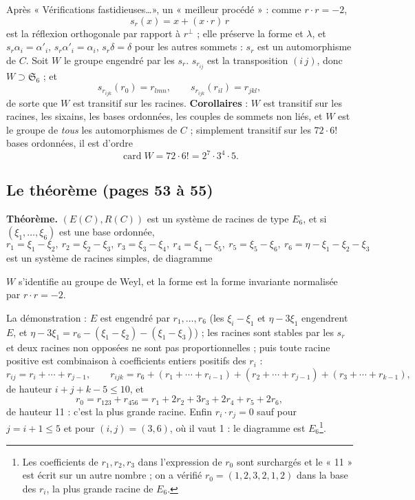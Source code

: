 \documentclass[11pt,a4paper]{article}
\begin{document}
Après « Vérifications fastidieuses\ldots », un « meilleur procédé » : comme $r
\cdot r = -2$,
\[
s_r(x) = x + (x \cdot r)\, r
\]
est la réflexion orthogonale par rapport à $r^\perp$ ; elle préserve la forme
et $\lambda$, et $s_r \alpha_i = \alpha'_i$, $s_r \alpha'_i = \alpha_i$, $s_r
\delta = \delta$ pour les autres sommets : $s_r$ est un automorphisme de $C$.
Soit $W$ le groupe engendré par les $s_r$. $s_{r_{ij}}$ est la transposition
$(i\, j)$, donc $W \supset \mathfrak{S}_6$ ; et
\[
s_{r_{ijk}}(r_0) = r_{lmn}, \qquad s_{r_{ijk}}(r_{il}) = r_{jkl},
\]
de sorte que $W$ est transitif sur les racines. \textbf{Corollaires} : $W$ est
transitif sur les racines, les sixains, les bases ordonnées, les couples de
sommets non liés, et $W$ est le groupe de \emph{tous} les automorphismes de
$C$ ; simplement transitif sur les $72 \cdot 6!$ bases ordonnées, il est
d'ordre
\[
\operatorname{card} W = 72 \cdot 6! = 2^7 \cdot 3^4 \cdot 5 .
\]

\subsection*{Le théorème (pages 53 à 55)}

\textbf{Théorème.} $(E(C), R(C))$ est un système de racines de type $E_6$, et
si $(\xi_1, \ldots, \xi_6)$ est une base ordonnée,
\[
r_1 = \xi_1 - \xi_2, \ r_2 = \xi_2 - \xi_3, \ r_3 = \xi_3 - \xi_4, \ r_4 =
\xi_4 - \xi_5, \ r_5 = \xi_5 - \xi_6, \ r_6 = \eta - \xi_1 - \xi_2 - \xi_3
\]
est un système de racines simples, de diagramme


$W$ s'identifie au groupe de Weyl, et la forme est la forme invariante
normalisée par $r \cdot r = -2$.

La démonstration : $E$ est engendré par $r_1, \ldots, r_6$ (les $\xi_i - \xi_1$
et $\eta - 3\xi_1$ engendrent $E$, et $\eta - 3\xi_1 = r_6 - (\xi_1 - \xi_2) -
(\xi_1 - \xi_3)$) ; les racines sont stables par les $s_r$ et deux racines non
opposées ne sont pas proportionnelles ; puis toute racine positive est
combinaison à coefficients entiers positifs des $r_i$ :
\[
r_{ij} = r_i + \cdots + r_{j-1}, \qquad r_{ijk} = r_6 + (r_1 + \cdots +
r_{i-1}) + (r_2 + \cdots + r_{j-1}) + (r_3 + \cdots + r_{k-1}),
\]
de hauteur $i + j + k - 5 \leq 10$, et
\[
r_0 = r_{123} + r_{456} = r_1 + 2r_2 + 3r_3 + 2r_4 + r_5 + 2r_6 ,
\]
de hauteur 11 : c'est la plus grande racine. Enfin $r_i \cdot r_j = 0$ sauf
pour $j = i + 1 \leq 5$ et pour $(i, j) = (3, 6)$, où il vaut 1 : le diagramme
est $E_6$\footnote{Les coefficients de $r_1, r_2, r_3$ dans l'expression de
$r_0$ sont surchargés et le « 11 » est écrit sur un autre nombre ; on a
vérifié $r_0 = (1, 2, 3, 2, 1, 2)$ dans la base des $r_i$, la plus grande
racine de $E_6$.}.
\end{document}
